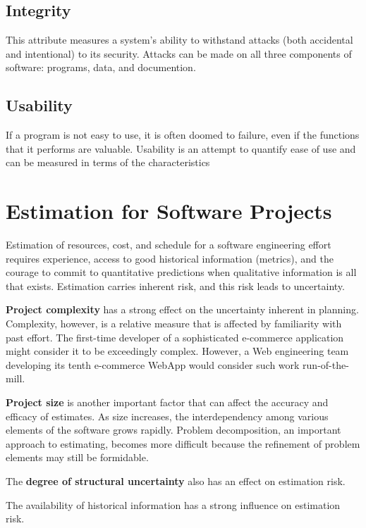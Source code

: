 \documentclass[12pt]{article}
\begin{document}
\subsection{Integrity}
This attribute measures a system’s ability
to withstand attacks (both accidental and intentional) to its security.
Attacks can be made on all three components of software: programs, data,
and documention.


\subsection{Usability}
If a program is not easy to use, it is often doomed to failure, even if
the functions that it performs are valuable. Usability is an attempt to quantify
ease of use and can be measured in terms of the characteristics




\section{Estimation for Software Projects}


Estimation of resources, cost, and schedule for a software engineering effort
requires experience, access to good historical information (metrics), and the courage
to commit to quantitative predictions when qualitative information is all that exists.
Estimation carries inherent risk, and this risk leads to uncertainty.



\textbf{Project complexity} has a strong effect on the uncertainty inherent in planning.
Complexity, however, is a relative measure that is affected by familiarity with past
effort. The first-time developer of a sophisticated e-commerce application might consider it to be exceedingly complex. However, a Web engineering team developing its
tenth e-commerce WebApp would consider such work run-of-the-mill.



\textbf{Project size} is another important factor that can affect the accuracy and efficacy of
estimates. As size increases, the interdependency among various elements of the
software grows rapidly. Problem decomposition, an important approach to estimating, becomes more difficult because the refinement of problem elements may still be
formidable.


The \textbf{degree of structural uncertainty} also has an effect on estimation risk.


The availability of historical information has a strong influence on estimation risk.
\end{document}
